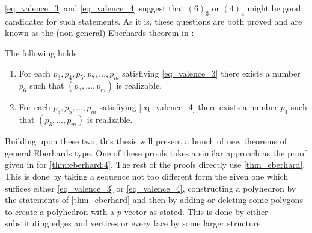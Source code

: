 \autoref{eq_valence_3} and \autoref{eq_valence_4} suggest that $(6)_3$ or $(4)_4$ might be good candidates for such statements. As it is, these questions are both proved and are known as the (non-general) Eberhards theorem in \cite{ConvexPolytopes}:
\renewcommand{\Itemautorefname}{Theorem \ref{thm_eberhard}}
\begin{theorem} \label{thm_eberhard} The following holds:
  \begin{enumerate}[label=(\roman*)]
    
  \item \label{thm:eberhard:3} For each $p_3, p_4, p_5, p_7, \dots, p_m$ satisfiying \autoref{eq_valence_3} there exists a number $p_6$ such that $(p_3, \dots, p_m)$ is realizable. 
  \item \label{thm:eberhard:4} For each $p_3, p_5, \dots, p_m$ satisfiying \autoref{eq_valence_4} there exists a number $p_4$ such that $(p_3, \dots, p_m)$ is realizable. 
  \end{enumerate}
\end{theorem}

Building upon these two, this thesis will present a bunch of new theorems of general Eberhards type. One of these proofs takes a similar approach as the proof given in \cite{ConvexPolytopes} for \autoref{thm:eberhard:4}. The rest of the proofs directly use \autoref{thm_eberhard}. This is done by taking a sequence not too different form the given one which suffices either \autoref{eq_valence_3} or \autoref{eq_valence_4}, constructing a polyhedron by the statements of \autoref{thm_eberhard} and then by adding or deleting some polygons to create a polyhedron with a $p$-vector as stated. This is done by either substituting edges and vertices or every face by some larger structure. 


